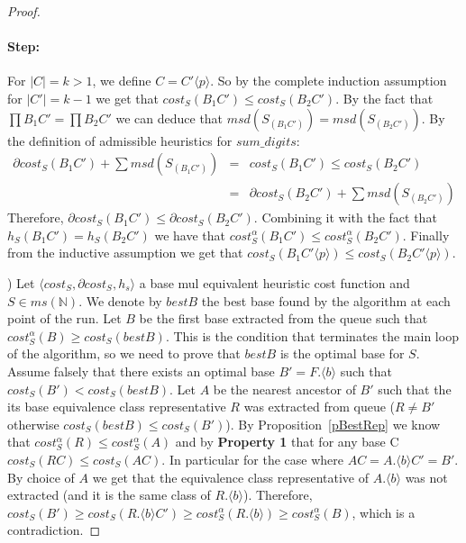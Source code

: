 \documentclass[envcountsame]{llncs}
\newcommand\tuple[1]{\langle #1 \rangle}
\newcommand{\intMultiSet}{\mathit{ms(\mathbb{N})}}
\newcommand{\sumDigits}{\mathit{sum\_digits}}
\newcommand{\cost}{\mathit{cost}}
\begin{document}
\begin{proof}
\paragraph{\bf Step:}  
For $|C|=k>1$, we define $C=C'\tuple{p}$. So
by
the complete
induction assumption for $|C'|=k-1$ we get that $cost_S(B_1 C') \leq
cost_S(B_2 C')$.  By the fact that $\prod B_1 C' = \prod B_2 C'$ we
can deduce that $msd(S_{(B_1 C')})=msd(S_{(B_2 C')})$. 
By the definition of  admissible heuristics for  $\sumDigits$:
\begin{eqnarray*}
  \partial \cost_S(B_1 C') + \sum msd(S_{(B_1 C')}) &=& 
  cost_S(B_1 C') \leq cost_S(B_2 C') \\
  &=& \partial \cost_S(B_2 C') + \sum msd(S_{(B_2 C')})
\end{eqnarray*}
Therefore, $\partial \cost_S(B_1 C') \leq \partial \cost_S(B_2
C')$.  Combining it with the fact that $h_S(B_1 C')=h_S(B_2 C')$ we
have that $\cost_S^\alpha(B_1 C') \leq \cost_S^\alpha(B_2 C')$. Finally
from the inductive assumption we get that $\cost_S(B_1 C' \tuple{p})
\leq \cost_S(B_2 C' \tuple{p})$.

) Let $\tuple{\cost_S,\partial \cost_S,h_s}$ a base mul equivalent
heuristic cost function and $S\in\intMultiSet$.  We denote by $bestB$
the best base found by the algorithm at each point of the run.  Let
$B$ be the first base extracted from the queue such that
$\cost_S^\alpha(B) \geq \cost_S(bestB)$.  This is the condition that
terminates the main loop of the algorithm, so we need to prove that
$bestB$ is the optimal base for $S$.
Assume falsely that there exists an optimal base $B'=F.\tuple{b}$ such
 that $\cost_S(B')<\cost_S(bestB)$.  Let $A$ be the nearest ancestor
 of $B'$ such that the its base equivalence class representative $R$
 was extracted from queue ($R\neq B'$ otherwise $\cost_S(bestB) \leq
 \cost_S(B')$).  By Proposition~\ref{pBestRep} we know that
 $\cost_S^\alpha(R)\leq \cost_S^\alpha(A)$ and by \textbf{Property 1} that
 for any base C $\cost_S(RC) \leq \cost_S(AC)$.  In particular for the
 case where $AC=A.\tuple{b}C'=B'$.  By choice of $A$ we get that
 the equivalence class representative of $A.\tuple{b}$ was not
 extracted (and it is the same class of $R.\tuple{b}$).  Therefore,
 $\cost_S(B') \geq \cost_S(R.\tuple{b}C') \geq
 \cost_S^\alpha(R.\tuple{b}) \geq \cost_S^\alpha(B)$, which is a
 contradiction.
\end{proof}
\end{document}
